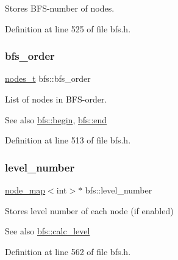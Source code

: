 Stores B\+F\+S-\/number of nodes. 



Definition at line 525 of file bfs.\+h.

\mbox{\label{classbfs_a2596d2cf52f6e7922fd94ce1adde760e}} 
\subsubsection{\texorpdfstring{bfs\+\_\+order}{bfs\_order}}
{\footnotesize\ttfamily \mbox{\hyperlink{edge_8h_a22ac17689106ba21a84e7bc54d1199d6}{nodes\+\_\+t}} bfs\+::bfs\+\_\+order\hspace{0.3cm}{\ttfamily [protected]}}



List of nodes in B\+F\+S-\/order. 

\begin{DoxySeeAlso}{See also}
\mbox{\hyperlink{classbfs_aff214e6d33f7f2bbd899cf335540def9}{bfs\+::begin}}, \mbox{\hyperlink{classbfs_ac35b3d3c37d33eb80adb752e17a60df9}{bfs\+::end}} 
\end{DoxySeeAlso}


Definition at line 513 of file bfs.\+h.

\mbox{\label{classbfs_aab92e9d128612c28324aafe4750dbc84}} 
\subsubsection{\texorpdfstring{level\+\_\+number}{level\_number}}
{\footnotesize\ttfamily \mbox{\hyperlink{classnode__map}{node\+\_\+map}}$<$int$>$$\ast$ bfs\+::level\+\_\+number\hspace{0.3cm}{\ttfamily [protected]}}



Stores level number of each node (if enabled) 

\begin{DoxySeeAlso}{See also}
\mbox{\hyperlink{classbfs_a491515da4eb8efca0be4fef0df350a8e}{bfs\+::calc\+\_\+level}} 
\end{DoxySeeAlso}


Definition at line 562 of file bfs.\+h.

\mbox{\label{classbfs_a056b2131db11e62eb8f41c8dcc117d2e}} 
